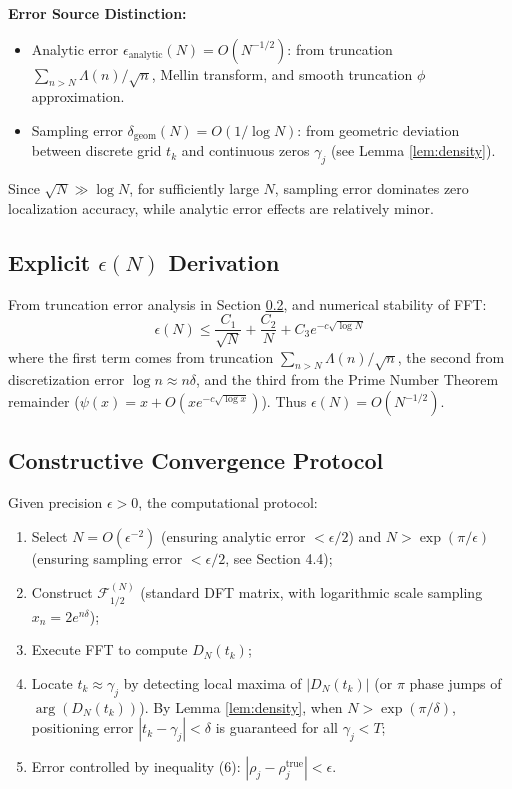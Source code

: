 \documentclass[12pt,a4paper]{amsart}
\theoremstyle{plain}
\theoremstyle{definition}
\theoremstyle{remark}
\begin{document}
\textbf{Error Source Distinction:}
\begin{itemize}
    \item Analytic error $\epsilon_{\text{analytic}}(N) = O(N^{-1/2})$: from truncation $\sum_{n>N} \Lambda(n)/\sqrt{n}$, Mellin transform, and smooth truncation $\phi$ approximation.
    \item Sampling error $\delta_{\text{geom}}(N) = O(1/\log N)$: from geometric deviation between discrete grid $t_k$ and continuous zeros $\gamma_j$ (see Lemma \ref{lem:density}).
\end{itemize}
Since $\sqrt{N} \gg \log N$, for sufficiently large $N$, sampling error dominates zero localization accuracy, while analytic error effects are relatively minor.

\subsection{Explicit $\epsilon(N)$ Derivation}

From truncation error analysis in Section \ref{sec:protocol}, and numerical stability of FFT:
\begin{equation}
\epsilon(N) \leq \frac{C_1}{\sqrt{N}} + \frac{C_2}{N} + C_3 e^{-c\sqrt{\log N}}
\end{equation}
where the first term comes from truncation $\sum_{n>N} \Lambda(n)/\sqrt{n}$, the second from discretization error $\log n \approx n\delta$, and the third from the Prime Number Theorem remainder ($\psi(x)=x+O(xe^{-c\sqrt{\log x}})$). Thus $\epsilon(N) = O(N^{-1/2})$.

\subsection{Constructive Convergence Protocol}\label{sec:protocol}

Given precision $\epsilon > 0$, the computational protocol:

\begin{enumerate}
    \item Select $N = O(\epsilon^{-2})$ (ensuring analytic error $<\epsilon/2$) and $N > \exp(\pi/\epsilon)$ (ensuring sampling error $<\epsilon/2$, see Section 4.4);
    \item Construct $\mathcal{F}_{1/2}^{(N)}$ (standard DFT matrix, with logarithmic scale sampling $x_n = 2e^{n\delta}$);
    \item Execute FFT to compute $D_N(t_k)$;
    \item Locate $t_k \approx \gamma_j$ by detecting local maxima of $|D_N(t_k)|$ (or $\pi$ phase jumps of $\arg(D_N(t_k))$). By Lemma \ref{lem:density}, when $N > \exp(\pi/\delta)$, positioning error $|t_k - \gamma_j| < \delta$ is guaranteed for all $\gamma_j < T$;
    \item Error controlled by inequality (6): $|\rho_j - \rho_j^{\mathrm{true}}| < \epsilon$.
\end{enumerate}
\end{document}

